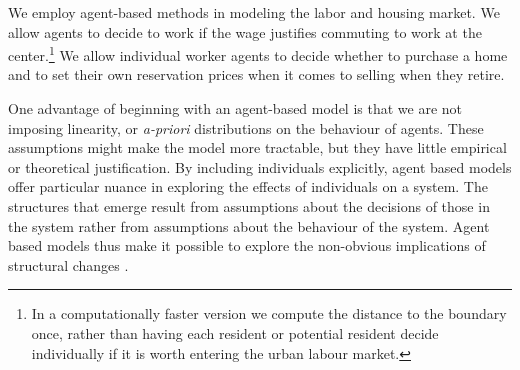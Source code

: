 We employ agent-based methods in modeling the labor and housing market. We allow agents to decide to work if the wage justifies commuting to work at the center.\footnote{In a computationally faster version we compute the distance to the boundary once, rather than having each resident or potential resident decide individually if it is worth entering the urban labour market.} We allow individual worker agents to decide whether to purchase a home and to set their own reservation prices when it comes to selling when they retire.

One advantage of beginning with an agent-based model is that we are not imposing linearity, or\textit{ a-priori }distributions on the behaviour of agents. These assumptions might make the model more tractable, but they have little empirical or theoretical justification. 
By including individuals explicitly, agent based models offer particular nuance in exploring the effects of individuals on a system. The structures that emerge result from assumptions about the decisions of those in the system rather from assumptions about the behaviour of the system. Agent based models thus make it possible to explore the non-obvious implications of structural changes \cite{darley_towards_1999, happe_agricultural_2004}. %






